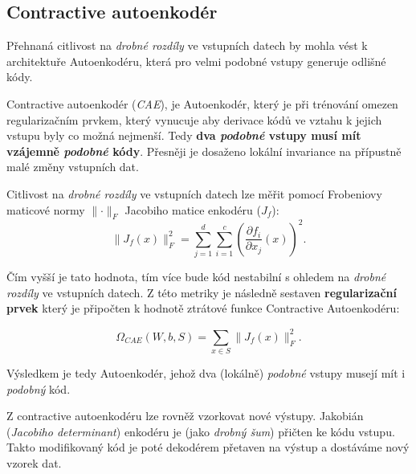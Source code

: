 \subsection{Contractive autoenkodér}
\label{sec:contractive_autoencoder}
Přehnaná citlivost na \emph{drobné rozdíly} ve vstupních datech by mohla vést k architektuře Autoenkodéru, která pro velmi podobné vstupy generuje odlišné kódy.

Contractive autoenkodér (\emph{CAE}), je Autoenkodér, který je při trénování omezen regularizačním prvkem,
který vynucuje aby derivace kódů ve vztahu k jejich vstupu byly co možná nejmenší.
Tedy \textbf{dva \emph{podobné} vstupy musí mít vzájemně \emph{podobné} kódy}.
Přesněji je dosaženo lokální invariance na přípustně malé změny vstupních dat. \cite{Rifai2012}

Citlivost na \emph{drobné rozdíly} ve vstupních datech lze měřit pomocí Frobeniovy maticové normy $\lVert \cdot \rVert_F$ Jacobiho matice enkodéru ($J_f$):
\begin{equation}
    \lVert J_f(x) \rVert^2_F = \sum_{j=1}^{d}\sum_{i=1}^{c} \left( \frac{\partial f_i}{\partial x_j} (x) \right) ^2 .
\end{equation}

Čím vyšší je tato hodnota, tím více bude kód nestabilní s ohledem na \emph{drobné rozdíly} ve vstupních datech.
Z této metriky je následně sestaven \textbf{regularizační prvek} který je připočten k hodnotě ztrátové funkce Contractive Autoenkodéru:

\begin{equation}
    \Omega_{CAE} (W, b, S) = \sum_{x \in S}^{} \lVert J_f(x) \rVert^2_F .
\end{equation}

Výsledkem je tedy Autoenkodér, jehož dva (lokálně) \emph{podobné} vstupy musejí mít i \emph{podobný} kód. \cite{Charte2018}

Z contractive autoenkodéru lze rovněž vzorkovat nové výstupy.
Jakobián (\emph{Jacobiho determinant}) enkodéru je (jako \emph{drobný šum}) přičten ke kódu vstupu.
Takto modifikovaný kód je poté dekodérem přetaven na výstup a dostáváme nový vzorek dat. \cite{Goodfellow2016}